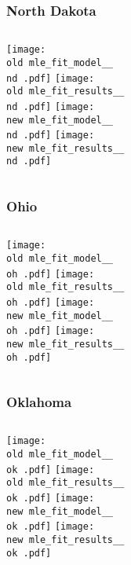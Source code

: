 \documentclass{beamer}
\newcommand{\old}{api-370-prod/pyseir/state_summaries/reports/}
\newcommand{\new}{new/pyseir/state_summaries/reports/}
\newcommand{\nd}{North Dakota__38}
\newcommand{\oh}{Ohio__39}
\newcommand{\ok}{Oklahoma__40}
\begin{document}
\begin{frame}
\frametitle{North Dakota}
    \begin{columns}[t]

       \texttt{[image: \\old mle\_fit\_model\_\_\\nd .pdf]}
       \texttt{[image: \\old mle\_fit\_results\_\_\\nd .pdf]}   
       \texttt{[image: \\new mle\_fit\_model\_\_\\nd .pdf]}
       \texttt{[image: \\new mle\_fit\_results\_\_\\nd .pdf]}   
\end{columns}
\end{frame}

\begin{frame}
\frametitle{Ohio}
    \begin{columns}[t]

       \texttt{[image: \\old mle\_fit\_model\_\_\\oh .pdf]}
       \texttt{[image: \\old mle\_fit\_results\_\_\\oh .pdf]}   
       \texttt{[image: \\new mle\_fit\_model\_\_\\oh .pdf]}
       \texttt{[image: \\new mle\_fit\_results\_\_\\oh .pdf]}   
\end{columns}
\end{frame}

\begin{frame}
\frametitle{Oklahoma}
    \begin{columns}[t]

       \texttt{[image: \\old mle\_fit\_model\_\_\\ok .pdf]}
       \texttt{[image: \\old mle\_fit\_results\_\_\\ok .pdf]}   
       \texttt{[image: \\new mle\_fit\_model\_\_\\ok .pdf]}
       \texttt{[image: \\new mle\_fit\_results\_\_\\ok .pdf]}   
\end{columns}
\end{frame}
\end{document}
